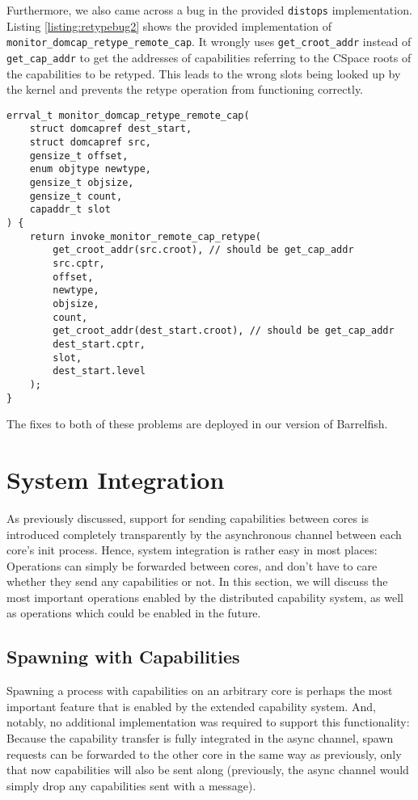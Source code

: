 Furthermore, we also came across a bug in the provided \texttt{distops} implementation. Listing \ref{listing:retypebug2} shows the provided implementation of \texttt{monitor\_domcap\_retype\_remote\_cap}. It wrongly uses \texttt{get\_croot\_addr} instead of \texttt{get\_cap\_addr} to get the addresses of capabilities referring to the CSpace roots of the capabilities to be retyped. This leads to the wrong slots being looked up by the kernel and prevents the retype operation from functioning correctly.

\begin{lstlisting}[caption={Bug in the invocation code for retyping a \texttt{domcap}},label={listing:retypebug2}]
errval_t monitor_domcap_retype_remote_cap(
    struct domcapref dest_start, 
    struct domcapref src, 
    gensize_t offset, 
    enum objtype newtype, 
    gensize_t objsize, 
    gensize_t count, 
    capaddr_t slot
) {
    return invoke_monitor_remote_cap_retype(
        get_croot_addr(src.croot), // should be get_cap_addr
        src.cptr, 
        offset, 
        newtype, 
        objsize, 
        count, 
        get_croot_addr(dest_start.croot), // should be get_cap_addr
        dest_start.cptr, 
        slot, 
        dest_start.level
    );
}
\end{lstlisting}

The fixes to both of these problems are deployed in our version of Barrelfish.

\section{System Integration}
As previously discussed, support for sending capabilities between cores is introduced completely transparently by the asynchronous channel between each core's init process. Hence, system integration is rather easy in most places: Operations can simply be forwarded between cores, and don't have to care whether they send any capabilities or not. In this section, we will discuss the most important operations enabled by the distributed capability system, as well as operations which could be enabled in the future.

\subsection{Spawning with Capabilities}
Spawning a process with capabilities on an arbitrary core is perhaps the most important feature that is enabled by the extended capability system. And, notably, no additional implementation was required to support this functionality: Because the capability transfer is fully integrated in the async channel, spawn requests can be forwarded to the other core in the same way as previously, only that now capabilities will also be sent along (previously, the async channel would simply drop any capabilities sent with a message).

